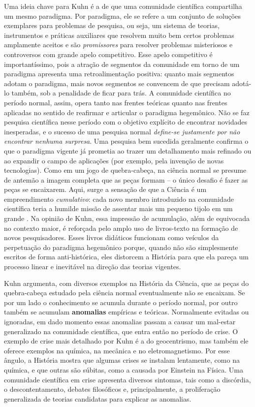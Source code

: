 \documentclass[./main.tex]{subfiles}
\begin{document}
\par Uma ideia chave para Kuhn é a de que uma comunidade científica compartilha um mesmo \gls{paradigma}. Por paradigma, ele se refere a um conjunto de soluções exemplares para problemas de pesquisa, ou seja, um sistema de teorias, instrumentos e práticas auxiliares que resolvem muito bem certos problemas amplamente aceitos e são \textit{promissores} para resolver problemas misteriosos e controversos com grande apelo competitivo. Esse apelo competitivo é importantíssimo, pois a atração de segmentos da comunidade em torno de um paradigma apresenta uma retroalimentação positiva: quanto mais segmentos adotam o paradigma, mais novos segmentos se convencem de que precisam adotá-lo também, sob a penalidade de ficar para trás. A comunidade científica no período normal, assim, opera tanto nas frentes teóricas quanto nas frentes aplicadas no sentido de reafirmar e articular o paradigma hegemônico. Não se faz pesquisa científica nesse período com o objetivo explícito de encontrar novidades inesperadas, e o sucesso de uma pesquisa normal \textit{define-se justamente por não encontrar nenhuma surpresa}. Uma pesquisa bem sucedida geralmente confirma o que o paradigma vigente já prometia ao trazer um detalhamento mais refinado ou ao expandir o campo de aplicações (por exemplo, pela invenção de novas tecnologias). Como em um jogo de quebra-cabeça, na ciência normal se presume de antemão a imagem completa que as peças formam – o único desafio é fazer as peças se encaixarem. Aqui, surge a sensação de que a Ciência é um empreendimento \textit{cumulativo}: cada novo membro introduzido na comunidade científica teria a humilde missão de assentar mais um pequeno tijolo em um grande . Na opinião de Kuhn, essa impressão de acumulação, além de equivocada no contexto maior, é reforçada pelo amplo uso de livros-texto na formação de novos pesquisadores. Esses livros didáticos funcionam como veículos da perpetuação do paradigma hegemônico porque, quando não são simplesmente escritos de forma anti-histórica, eles distorcem a História para que ela pareça um processo linear e inevitável na direção das teorias vigentes.

\par Kuhn argumenta, com diversos exemplos na História da Ciência, que as peças do quebra-cabeça estudado pela ciência normal eventualmente não se encaixam. Se por um lado o conhecimento se acumula durante o período normal, por outro também se acumulam \textbf{anomalias} empíricas e teóricas. Normalmente evitadas ou ignoradas, em dado momento essas anomalias passam a causar um mal-estar generalizado na comunidade científica, que entra então no período de crise. O exemplo de crise mais detalhado por Kuhn é a do geocentrismo, mas também ele oferece exemplos na química, na mecânica e no eletromagnetismo. Por esse ângulo, a História mostra que algumas crises se instalam lentamente, como na química, e que outras são súbitas, como a causada por Einstein na Física. Uma comunidade científica em crise apresenta diversos sintomas, tais como a discórdia, o descontentamento, debates filosóficos e, principalmente, a proliferação generalizada de teorias candidatas para explicar as anomalias.
\end{document}
